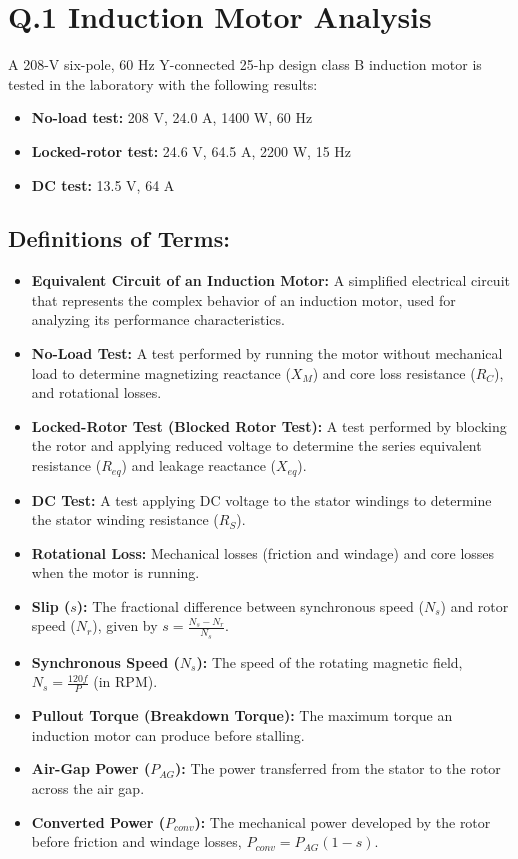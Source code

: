 \documentclass{article}
\begin{document}
	
	\section*{Q.1 Induction Motor Analysis}
	
	A 208-V six-pole, 60 Hz Y-connected 25-hp design class B induction motor is tested in the laboratory with the following results:
	
	\begin{itemize}
		\item \textbf{No-load test:} 208 V, 24.0 A, 1400 W, 60 Hz
		\item \textbf{Locked-rotor test:} 24.6 V, 64.5 A, 2200 W, 15 Hz
		\item \textbf{DC test:} 13.5 V, 64 A
	\end{itemize}
	
	\subsection*{Definitions of Terms:}
	
	\begin{itemize}
		\item \textbf{Equivalent Circuit of an Induction Motor:} A simplified electrical circuit that represents the complex behavior of an induction motor, used for analyzing its performance characteristics.
		\item \textbf{No-Load Test:} A test performed by running the motor without mechanical load to determine magnetizing reactance ($X_M$) and core loss resistance ($R_C$), and rotational losses.
		\item \textbf{Locked-Rotor Test (Blocked Rotor Test):} A test performed by blocking the rotor and applying reduced voltage to determine the series equivalent resistance ($R_{eq}$) and leakage reactance ($X_{eq}$).
		\item \textbf{DC Test:} A test applying DC voltage to the stator windings to determine the stator winding resistance ($R_S$).
		\item \textbf{Rotational Loss:} Mechanical losses (friction and windage) and core losses when the motor is running.
		\item \textbf{Slip ($s$):} The fractional difference between synchronous speed ($N_s$) and rotor speed ($N_r$), given by $s = \frac{N_s - N_r}{N_s}$.
		\item \textbf{Synchronous Speed ($N_s$):} The speed of the rotating magnetic field, $N_s = \frac{120f}{P}$ (in RPM).
		\item \textbf{Pullout Torque (Breakdown Torque):} The maximum torque an induction motor can produce before stalling.
		\item \textbf{Air-Gap Power ($P_{AG}$):} The power transferred from the stator to the rotor across the air gap.
		\item \textbf{Converted Power ($P_{conv}$):} The mechanical power developed by the rotor before friction and windage losses, $P_{conv} = P_{AG}(1-s)$.
	\end{itemize}
	
\end{document}
